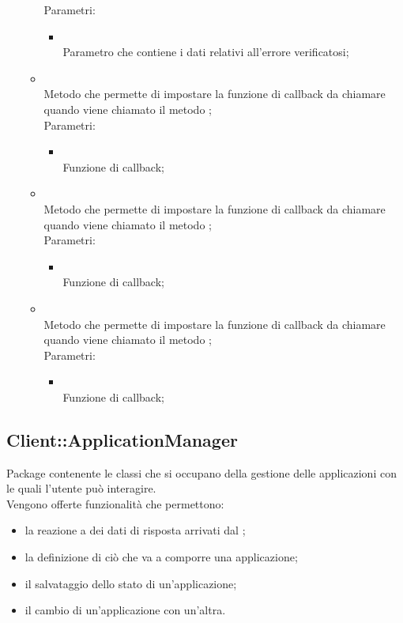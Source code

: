 \begin{itemize}
\begin{itemize}
		Parametri:
		\begin{itemize}
			\item {} \\
			Parametro che contiene i dati relativi all'errore verificatosi;
		\end{itemize}
		\item[]  \\
		Metodo che permette di impostare la funzione di callback da chiamare quando viene chiamato il metodo ;\\
		Parametri:
		\begin{itemize}
			\item {} \\
			Funzione di callback;
		\end{itemize}
		\item[]  \\
		Metodo che permette di impostare la funzione di callback da chiamare quando viene chiamato il metodo ;\\
		Parametri:
		\begin{itemize}
			\item {} \\
			Funzione di callback;
		\end{itemize}
		\item[]  \\
		Metodo che permette di impostare la funzione di callback da chiamare quando viene chiamato il metodo ;\\
		Parametri:
		\begin{itemize}
			\item {} \\
			Funzione di callback;
		\end{itemize}
	\end{itemize}
\end{itemize}
\FloatBarrier

\subsection{Client::ApplicationManager}
Package contenente le classi che si occupano della gestione delle applicazioni con le quali l'utente può interagire.\\
Vengono offerte funzionalità che permettono:
\begin{itemize}
\item la reazione a dei dati di risposta arrivati dal ;
\item la definizione di ciò che va a comporre una applicazione;
\item il salvataggio dello stato di un'applicazione;
\item il cambio di un'applicazione con un'altra.
\end{itemize}
